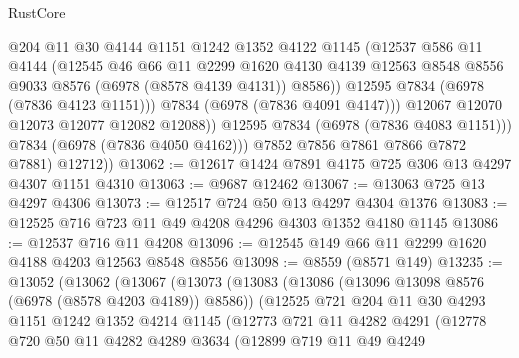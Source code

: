 \begin{lexlean}{RustCore}
\begin{coremodule}
                      @204
                      @11
                      @30
                      @4144
                      @1151
                      @1242
                      @1352
                      @4122
                      @1145
                      (@12537
                        @586
                        @11
                        @4144
                        (@12545
                          @46
                          @66
                          @11
                          @2299
                          @1620
                          @4130
                          @4139
                          @12563
                          @8548
                          @8556
                          @9033
                          @8576
                          (@6978 (@8578 @4139 @4131))
                          @8586))
                      @12595
                      @7834
                      (@6978 (@7836 @4123 @1151)))
                    @7834
                    (@6978 (@7836 @4091 @4147)))
                  @12067
                  @12070
                  @12073
                  @12077
                  @12082
                  @12088))
              @12595
              @7834
              (@6978 (@7836 @4083 @1151)))
            @7834
            (@6978 (@7836 @4050 @4162)))
          @7852
          @7856
          @7861
          @7866
          @7872
          @7881)
        @12712))
@13062 := @12617 @1424 @7891 @4175 @725 @306 @13 @4297 @4307 @1151 @4310
@13063 := @9687 @12462
@13067 := @13063 @725 @13 @4297 @4306
@13073 := @12517 @724 @50 @13 @4297 @4304 @1376
@13083 := @12525 @716 @723 @11 @49 @4208 @4296 @4303 @1352 @4180 @1145
@13086 := @12537 @716 @11 @4208
@13096 := @12545 @149 @66 @11 @2299 @1620 @4188 @4203 @12563 @8548 @8556
@13098 := @8559 (@8571 @149)
@13235 := @13052
    (@13062
      (@13067
        (@13073
          (@13083
            (@13086 (@13096 @13098 @8576 (@6978 (@8578 @4203 @4189)) @8586))
            (@12525
              @721
              @204
              @11
              @30
              @4293
              @1151
              @1242
              @1352
              @4214
              @1145
              (@12773
                @721
                @11
                @4282
                @4291
                (@12778
                  @720
                  @50
                  @11
                  @4282
                  @4289
                  @3634
                  (@12899
                    @719
                    @11
                    @49
                    @4249

\end{coremodule}
\end{lexlean}

